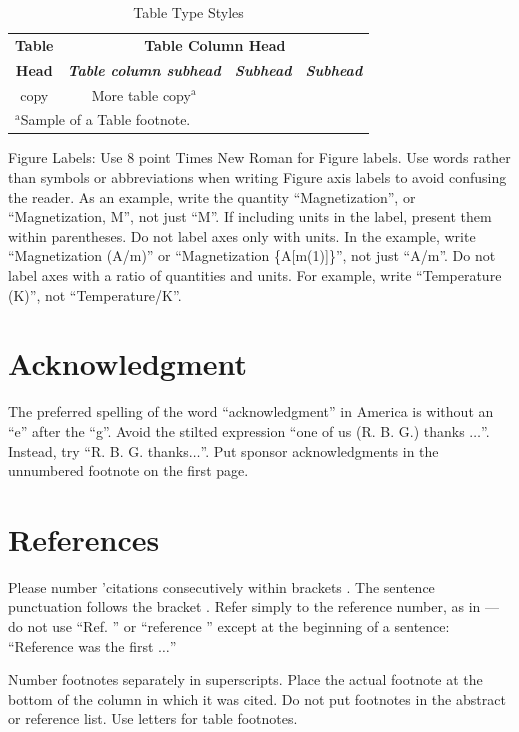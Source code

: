 \documentclass[conference]{IEEEtran}
\begin{document}
\begin{table}[htbp]
\caption{Table Type Styles}
\begin{center}
\begin{tabular}{|c|c|c|c|}
\hline
\textbf{Table}&\multicolumn{3}{|c|}{\textbf{Table Column Head}} \\
\cline{2-4} 
\textbf{Head} & \textbf{\textit{Table column subhead}}& \textbf{\textit{Subhead}}& \textbf{\textit{Subhead}} \\
\hline
copy& More table copy$^{\mathrm{a}}$& &  \\
\hline
\multicolumn{4}{l}{$^{\mathrm{a}}$Sample of a Table footnote.}
\end{tabular}
\label{tab1}
\end{center}
\end{table}


Figure Labels: Use 8 point Times New Roman for Figure labels. Use words 
rather than symbols or abbreviations when writing Figure axis labels to 
avoid confusing the reader. As an example, write the quantity 
``Magnetization'', or ``Magnetization, M'', not just ``M''. If including 
units in the label, present them within parentheses. Do not label axes only 
with units. In the example, write ``Magnetization (A/m)'' or ``Magnetization 
\{A[m(1)]\}'', not just ``A/m''. Do not label axes with a ratio of 
quantities and units. For example, write ``Temperature (K)'', not 
``Temperature/K''.

\section*{Acknowledgment}

The preferred spelling of the word ``acknowledgment'' in America is without 
an ``e'' after the ``g''. Avoid the stilted expression ``one of us (R. B. 
G.) thanks $\ldots$''. Instead, try ``R. B. G. thanks$\ldots$''. Put sponsor 
acknowledgments in the unnumbered footnote on the first page.

\section*{References}

Please number 'citations consecutively within brackets . The 
sentence punctuation follows the bracket . Refer simply to the reference 
number, as in ---do not use ``Ref. '' or ``reference '' except at 
the beginning of a sentence: ``Reference  was the first $\ldots$''

Number footnotes separately in superscripts. Place the actual footnote at 
the bottom of the column in which it was cited. Do not put footnotes in the 
abstract or reference list. Use letters for table footnotes.
\end{document}
